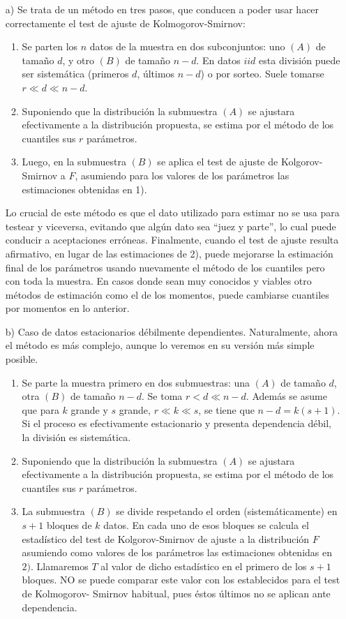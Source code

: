 \documentclass[
  12pt]{article}
\begin{document}
\begin{itemize}
\item[a)] Se trata de un método en tres pasos, que conducen a poder usar hacer correctamente el test de ajuste de Kolmogorov-Smirnov: 
\begin{enumerate}
\item Se parten los $n$ datos de la muestra en dos subconjuntos: uno $(A)$ de tamaño $d$, y otro $(B)$ de tamaño  $n-d$. En datos $iid$ esta división puede ser sistemática (primeros $d$, últimos $n-d$) o por sorteo. Suele tomarse $r  \ll d  \ll n-d$.
\item Suponiendo que la distribución la submuestra $(A)$ se ajustara efectivamente a la distribución propuesta, se estima por el método de los cuantiles sus $r$ parámetros.
\item Luego, en la submuestra $(B)$ se aplica el test de ajuste de Kolgorov-Smirnov a $F$, asumiendo para los valores de los parámetros las estimaciones obtenidas en 1).
\end{enumerate}
Lo crucial de este método es que el dato utilizado para estimar no se usa para testear y viceversa, evitando que algún dato sea “juez y parte”, lo cual puede conducir a aceptaciones erróneas.
Finalmente, cuando el test de ajuste resulta afirmativo, en lugar de las estimaciones de 2), puede mejorarse la estimación final de los parámetros usando nuevamente el método de los cuantiles pero con toda la muestra.
En casos donde sean muy conocidos y viables otro métodos de estimación como el de los momentos, puede cambiarse cuantiles por momentos en lo anterior.
\item[b)] Caso de datos estacionarios débilmente dependientes.
Naturalmente, ahora el método es más complejo, aunque lo veremos en su versión más simple posible.
\begin{enumerate}
\item Se parte la muestra primero en dos submuestras: una $(A)$ de tamaño $d$, otra $(B)$ de tamaño $n-d$. Se toma $r< d \ll n-d$. Además se asume que para $k$ grande y $s$ grande, $r\ll k \ll s$, se tiene que $n-d= k(s+1)$. Si el proceso es efectivamente estacionario y presenta dependencia débil, la división es sistemática.
\item Suponiendo que la distribución la submuestra $(A)$ se ajustara efectivamente a la distribución propuesta, se estima por el método de los cuantiles sus $r$ parámetros.
\item La submuestra $(B)$ se divide respetando el orden (sistemáticamente) en $s+1$ bloques de $k$ datos. En cada uno de esos bloques se calcula el estadístico del test de Kolgorov-Smirnov de ajuste a la distribución $F$ asumiendo como valores de los parámetros las estimaciones obtenidas en $2)$. Llamaremos $T$ al valor de dicho estadístico en el primero de los $s+1$ bloques. NO se puede comparar este valor con los establecidos para el test de Kolmogorov- Smirnov habitual, pues éstos últimos no se aplican ante dependencia.

\end{enumerate}
\end{itemize}
\end{document}
